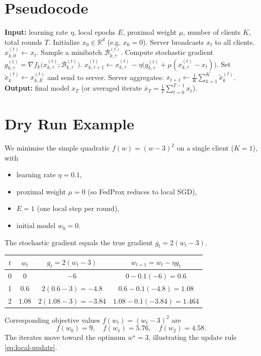 \documentclass[11pt]{article}
\newcommand{\R}{\mathbb{R}}
\begin{document}
\section*{Pseudocode}
\begin{algorithm}[H]
\caption{FedProx (Local SGD with Proximal Term)}\label{alg:fedprox}
\begin{algorithmic}[1]
\STATE \textbf{Input:} learning rate $\eta$, local epochs $E$, proximal weight $\mu$, number of clients $K$, total rounds $T$.
\STATE Initialize $x_0\in\R^d$ (e.g. $x_0=0$).
    \STATE Server broadcasts $x_t$ to all clients.
        \STATE $x_{k,0}^{(t)}\gets x_t$.
            \STATE Sample a minibatch $\mathcal{B}_{k,\tau}^{(t)}$.
            \STATE Compute stochastic gradient $g_{k,\tau}^{(t)}=\nabla f_k\bigl(x_{k,\tau}^{(t)};\mathcal{B}_{k,\tau}^{(t)}\bigr)$.
            \STATE $x_{k,\tau+1}^{(t)}\gets x_{k,\tau}^{(t)}-\eta\bigl(g_{k,\tau}^{(t)}+\mu (x_{k,\tau}^{(t)}-x_t)\bigr)$.
        \ENDFOR
        \STATE Set $\tilde x_{k}^{(t)}\gets x_{k,E}^{(t)}$ and send to server.
    \ENDFOR
    \STATE Server aggregates: $x_{t+1}\gets \frac1K\sum_{k=1}^K \tilde x_{k}^{(t)}$.
\ENDFOR
\STATE \textbf{Output:} final model $x_T$ (or averaged iterate $\bar x_T=\frac1T\sum_{t=0}^{T-1}x_t$).
\end{algorithmic}
\end{algorithm}

\section*{Dry Run Example}
We minimise the simple quadratic $f(w)=(w-3)^2$ on a single client ($K=1$), with
\begin{itemize}
    \item learning rate $\eta=0.1$,
    \item proximal weight $\mu=0$ (so FedProx reduces to local SGD),
    \item $E=1$ (one local step per round),
    \item initial model $w_0=0$.
\end{itemize}
The stochastic gradient equals the true gradient $g_t=2(w_t-3)$.

\begin{center}
\begin{tabular}{c|c|c|c}
$t$ & $w_t$ & $g_t=2(w_t-3)$ & $w_{t+1}=w_t-\eta g_t$ \\ \hline
0 & $0$ & $-6$ & $0-0.1(-6)=0.6$ \\
1 & $0.6$ & $2(0.6-3)=-4.8$ & $0.6-0.1(-4.8)=1.08$ \\
2 & $1.08$ & $2(1.08-3)=-3.84$ & $1.08-0.1(-3.84)=1.464$ \\
\end{tabular}
\end{center}
Corresponding objective values $f(w_t)=(w_t-3)^2$ are
\[
f(w_0)=9,\quad f(w_1)=5.76,\quad f(w_2)=4.58.
\]
The iterates move toward the optimum $w^\star=3$, illustrating the update rule \eqref{eq:local-update}.
\end{document}
